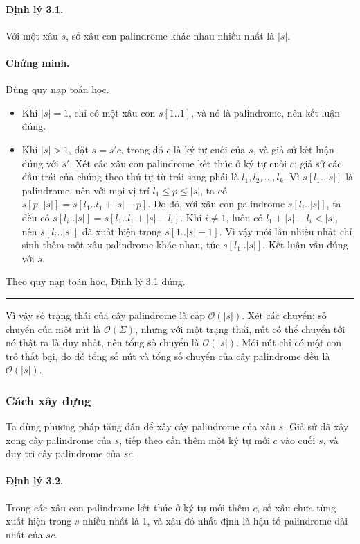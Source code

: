 \documentclass[11pt]{article}
\newcommand{\Oh}{\mathcal{O}}
\newcommand{\qedmark}{\hfill\rule{0.7ex}{0.7ex}}
\begin{document}
\paragraph{Định lý 3.1.}
Với một xâu \(s\), số xâu con palindrome khác nhau nhiều nhất là \(|s|\).

\paragraph{Chứng minh.}
Dùng quy nạp toán học.

\begin{itemize}
  \item Khi \(|s|=1\), chỉ có một xâu con \(s[1..1]\), và nó là palindrome,
  nên kết luận đúng.
  \item Khi \(|s|>1\), đặt \(s=s'c\), trong đó \(c\) là ký tự cuối của \(s\),
  và giả sử kết luận đúng với \(s'\). Xét các xâu con palindrome kết thúc ở ký
  tự cuối \(c\); giả sử các đầu trái của chúng theo thứ tự từ trái sang phải
  là \(l_1,l_2,\ldots,l_k\). Vì \(s[l_1..|s|]\) là palindrome, nên với mọi vị
  trí \(l_1\le p\le |s|\), ta có
  \(s[p..|s|]=s[l_1..l_1+|s|-p]\). Do đó, với xâu con palindrome
  \(s[l_i..|s|]\), ta đều có
  \(s[l_i..|s|]=s[l_1..l_1+|s|-l_i]\). Khi \(i\ne 1\), luôn có
  \(l_1+|s|-l_i<|s|\), nên \(s[l_i..|s|]\) đã xuất hiện trong
  \(s[1..|s|-1]\). Vì vậy mỗi lần nhiều nhất chỉ sinh thêm một xâu palindrome
  khác nhau, tức \(s[l_1..|s|]\). Kết luận vẫn đúng với \(s\).
\end{itemize}

Theo quy nạp toán học, Định lý 3.1 đúng. \qedmark

Vì vậy số trạng thái của cây palindrome là cấp \(\Oh(|s|)\). Xét các chuyển:
số chuyển của một nút là \(\Oh(\Sigma)\), nhưng với một trạng thái, nút có thể
chuyển tới nó thật ra là duy nhất, nên tổng số chuyển là \(\Oh(|s|)\). Mỗi nút
chỉ có một con trỏ thất bại, do đó tổng số nút và tổng số chuyển của cây
palindrome đều là \(\Oh(|s|)\).

\subsubsection{Cách xây dựng}

Ta dùng phương pháp tăng dần để xây cây palindrome của xâu \(s\). Giả sử đã
xây xong cây palindrome của \(s\), tiếp theo cần thêm một ký tự mới \(c\) vào
cuối \(s\), và duy trì cây palindrome của \(sc\).

\paragraph{Định lý 3.2.}
Trong các xâu con palindrome kết thúc ở ký tự mới thêm \(c\), số xâu chưa từng
xuất hiện trong \(s\) nhiều nhất là \(1\), và xâu đó nhất định là hậu tố
palindrome dài nhất của \(sc\).
\end{document}
